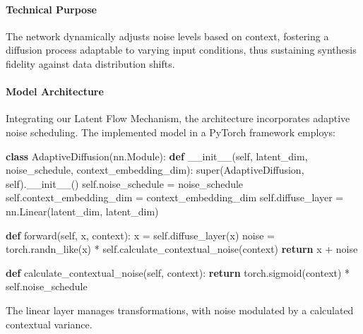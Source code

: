 \documentclass{article} %
\begin{document}
\paragraph{Technical Purpose}
The network dynamically adjusts noise levels based on context, fostering a diffusion process adaptable to varying input conditions, thus sustaining synthesis fidelity against data distribution shifts.

\paragraph{Model Architecture}
Integrating our Latent Flow Mechanism, the architecture incorporates adaptive noise scheduling. The implemented model in a PyTorch framework employs:


\begin{algorithm}
\caption{AdaptiveDiffusion}
\label{alg:adaptive_diffusion}
\begin{algorithmic}[1]

\STATE \textbf{class} AdaptiveDiffusion(nn.Module):
\STATE \hspace{0.5cm} \textbf{def} \_\_init\_\_(self, latent\_dim, noise\_schedule, context\_embedding\_dim):
\STATE \hspace{1cm} super(AdaptiveDiffusion, self).\_\_init\_\_()
\STATE \hspace{1cm} self.noise\_schedule = noise\_schedule
\STATE \hspace{1cm} self.context\_embedding\_dim = context\_embedding\_dim
\STATE \hspace{1cm} self.diffuse\_layer = nn.Linear(latent\_dim, latent\_dim)

\STATE
\STATE \hspace{0.5cm} \textbf{def} forward(self, x, context):
\STATE \hspace{1cm} x = self.diffuse\_layer(x)
\STATE \hspace{1cm} noise = torch.randn\_like(x) * self.calculate\_contextual\_noise(context)
\STATE \hspace{1cm} \textbf{return} x + noise

\STATE
\STATE \hspace{0.5cm} \textbf{def} calculate\_contextual\_noise(self, context):
\STATE \hspace{1cm} \textbf{return} torch.sigmoid(context) * self.noise\_schedule

\end{algorithmic}
\end{algorithm}
The linear layer manages transformations, with noise modulated by a calculated contextual variance.
\end{document}
